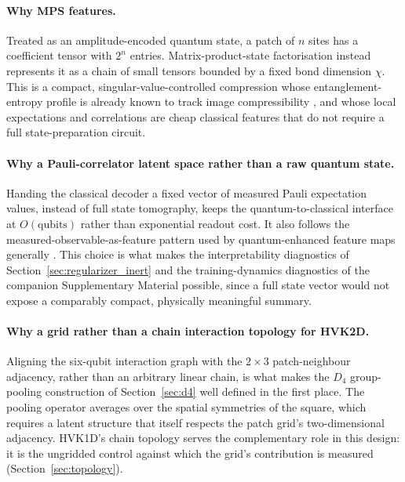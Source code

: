 \documentclass[pdflatex,sn-basic]{sn-jnl}
\begin{document}
\paragraph{Why MPS features.}
Treated as an amplitude-encoded quantum state, a patch of $n$ sites has a
coefficient tensor with $2^{n}$ entries. Matrix-product-state factorisation
instead represents it as a chain of small tensors bounded by a fixed bond
dimension $\chi$. This is a compact, singular-value-controlled compression whose
entanglement-entropy profile is already known to track image compressibility
\citep{Latorre2005, Stoudenmire2016}, and whose local expectations and
correlations are cheap classical features that do not require a full
state-preparation circuit.


\paragraph{Why a Pauli-correlator latent space rather than a raw quantum state.}
Handing the classical decoder a fixed vector of measured Pauli expectation
values, instead of full state tomography, keeps the quantum-to-classical
interface at $O(\text{qubits})$ rather than exponential readout cost. It also
follows the measured-observable-as-feature pattern used by quantum-enhanced
feature maps generally \citep{Havlicek2019}. This choice is what makes the
interpretability diagnostics of Section~\ref{sec:regularizer_inert} and the
training-dynamics diagnostics of the companion Supplementary Material possible,
since a full state vector would not expose a comparably compact, physically
meaningful summary.



\paragraph{Why a grid rather than a chain interaction topology for HVK2D.}
Aligning the six-qubit interaction graph with the $2\times3$ patch-neighbour
adjacency, rather than an arbitrary linear chain, is what makes the $D_4$
group-pooling construction of Section~\ref{sec:d4} well defined in the first
place. The pooling operator averages over the spatial symmetries of the square,
which requires a latent structure that itself respects the patch grid's
two-dimensional adjacency. HVK1D's chain topology serves the complementary role
in this design: it is the ungridded control against which the grid's
contribution is measured (Section~\ref{sec:topology}).
\end{document}
